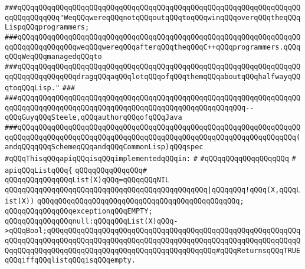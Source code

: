 \verb|###qQQqqQQqqQQqqQQqqQQqqQQqqQQqqQQqqQQqqQQqqQQqqQQqqQQqqQQqqQQqqQQqqQQqqQQqqQQqqQQq"WeqQQqwereqQQqnotqQQqoutqQQqtoqQQqwinqQQqoverqQQqtheqQQqLispqQQqprogrammers;|\newline
\verb|###qQQqqQQqqQQqqQQqqQQqqQQqqQQqqQQqqQQqqQQqqQQqqQQqqQQqqQQqqQQqqQQqqQQqqQQqqQQqqQQqqQQqweqQQqwereqQQqafterqQQqtheqQQqC++qQQqprogrammers.qQQqqQQqWeqQQqmanagedqQQqto|\newline
\verb|###qQQqqQQqqQQqqQQqqQQqqQQqqQQqqQQqqQQqqQQqqQQqqQQqqQQqqQQqqQQqqQQqqQQqqQQqqQQqqQQqqQQqdragqQQqaqQQqlotqQQqofqQQqthemqQQqaboutqQQqhalfwayqQQqtoqQQqLisp."|\newline
\verb|###|\newline
\verb|###qQQqqQQqqQQqqQQqqQQqqQQqqQQqqQQqqQQqqQQqqQQqqQQqqQQqqQQqqQQqqQQqqQQqqQQqqQQqqQQqqQQqqQQqqQQqqQQqqQQqqQQqqQQqqQQqqQQqqQQqqQQq--qQQqGuyqQQqSteele,qQQqauthorqQQqofqQQqJava|\newline
\verb|###qQQqqQQqqQQqqQQqqQQqqQQqqQQqqQQqqQQqqQQqqQQqqQQqqQQqqQQqqQQqqQQqqQQqqQQqqQQqqQQqqQQqqQQqqQQqqQQqqQQqqQQqqQQqqQQqqQQqqQQqqQQqqQQqqQQqqQQq(andqQQqqQQqSchemeqQQqandqQQqCommonLisp)qQQqspec|\newline
\newline
\newline
\newline
\verb|#qQQqThisqQQqapiqQQqisqQQqimplementedqQQqin:|\newline
\verb|#|\newline
\verb|#qQQqqQQqqQQqqQQqqQQq|\newline
\verb|#|\newline
\verb|apiqQQqListqQQq{|\newline
\verb|qQQqqQQqqQQqqQQq#|\newline
\verb|qQQqqQQqqQQqqQQqList(X)qQQq=qQQqqQQqNIL|\newline
\verb|qQQqqQQqqQQqqQQqqQQqqQQqqQQqqQQqqQQqqQQqqQQqqQQq|\verb#|qQQqqQQq!qQQq(X,qQQqList(X))#\newline
\verb|qQQqqQQqqQQqqQQqqQQqqQQqqQQqqQQqqQQqqQQqqQQqqQQq;|\newline
\newline
\verb|qQQqqQQqqQQqqQQqexceptionqQQqEMPTY;|\newline
\newline
\verb|qQQqqQQqqQQqqQQqnull:qQQqqQQqList(X)qQQq->qQQqBool;qQQqqQQqqQQqqQQqqQQqqQQqqQQqqQQqqQQqqQQqqQQqqQQqqQQqqQQqqQQqqQQqqQQqqQQqqQQqqQQqqQQqqQQqqQQqqQQqqQQqqQQqqQQqqQQqqQQqqQQqqQQqqQQqqQQqqQQqqQQqqQQqqQQqqQQqqQQqqQQqqQQqqQQqqQQqqQQqqQQq#qQQqReturnsqQQqTRUEqQQqiffqQQqlistqQQqisqQQqempty.|\newline
